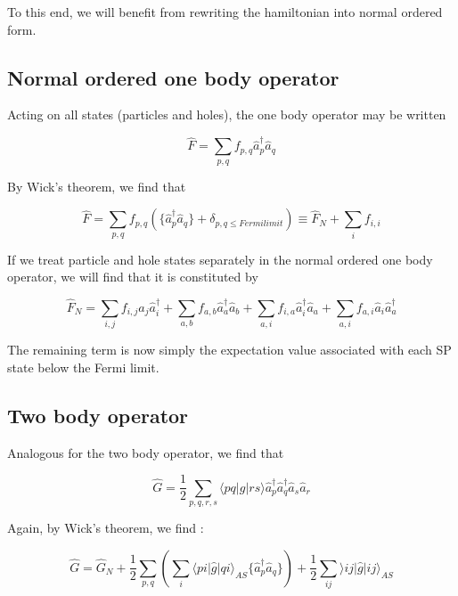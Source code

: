 To this end, we will benefit from rewriting the hamiltonian into normal ordered form.

\subsection{Normal ordered one body operator}

Acting on all states (particles and holes), the one body operator may be written

\begin{equation}
\hat{F} = \sum_{p,q} f_{p,q}  \hat{a}_p^{\dagger} \hat{a}_q
\label{eqn:onebody_n}
\end{equation}

By Wick's theorem, we find that

\begin{equation}
\hat{F} = \sum_{p,q} f_{p,q}  (\{\hat{a}_p^{\dagger} \hat{a}_q \} + \delta_{p,q \leq Fermilimit}) \equiv \hat{F}_N + \sum_{i} f_{i,i} 
\label{eqn:onebody_n2}
\end{equation}

If we treat particle and hole states separately in the normal ordered one body operator, we will find that it is constituted by

\begin{equation}
\hat{F}_N = \sum_{i,j} f_{i,j}   \hat{a}_j \hat{a}_i^{\dagger} + \sum_{a,b} f_{a,b}  \hat{a}_a^{\dagger} \hat{a}_b + \sum_{a,i} f_{i,a}  \hat{a}_i^{\dagger} \hat{a}_a + \sum_{a,i} f_{a,i}   \hat{a}_i \hat{a}_a^{\dagger}
\label{eqn:onebody_N}
\end{equation}

The remaining term is now simply the expectation value associated with each SP state below the Fermi limit.

\subsection{Two body operator}

Analogous for the two body operator, we find that

\begin{equation}
\hat{G} = \frac{1}{2} \sum_{p,q,r,s} \langle pq \vert g \vert rs \rangle  \hat{a}_{p}^{\dagger}\hat{a}_{q}^{\dagger} \hat{a}_{s} \hat{a}_r
\label{eqn:twobody_n}
\end{equation}

Again, by Wick's theorem, we find \cite[p.82]{ShavittBartlett2009}:

\begin{equation}
\hat{G} = \hat{G}_N + \frac{1}{2} \sum_{p,q} (\sum_i \langle pi \vert \hat{g} \vert qi \rangle_{AS} \{ \hat{a}_p^{\dagger} \hat{a}_q \}) + \frac{1}{2} \sum_{ij} \rangle ij \vert \hat{g} \vert ij \rangle_{AS}
\label{eqn:twobody_N}
\end{equation}

